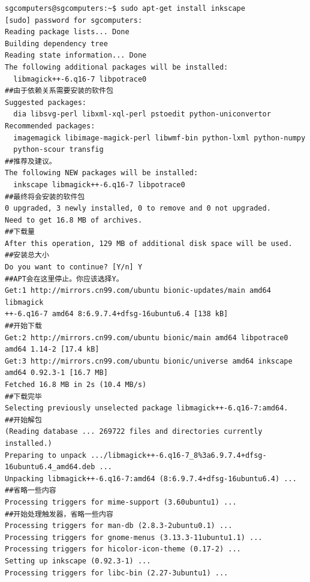 \begin{verbatim}
sgcomputers@sgcomputers:~$ sudo apt-get install inkscape
[sudo] password for sgcomputers: 
Reading package lists... Done
Building dependency tree       
Reading state information... Done
The following additional packages will be installed:
  libmagick++-6.q16-7 libpotrace0
##由于依赖关系需要安装的软件包
Suggested packages:
  dia libsvg-perl libxml-xql-perl pstoedit python-uniconvertor
Recommended packages:
  imagemagick libimage-magick-perl libwmf-bin python-lxml python-numpy
  python-scour transfig
##推荐及建议。
The following NEW packages will be installed:
  inkscape libmagick++-6.q16-7 libpotrace0
##最终将会安装的软件包
0 upgraded, 3 newly installed, 0 to remove and 0 not upgraded.
Need to get 16.8 MB of archives.
##下载量
After this operation, 129 MB of additional disk space will be used.
##安装总大小
Do you want to continue? [Y/n] Y
##APT会在这里停止。你应该选择Y。
Get:1 http://mirrors.cn99.com/ubuntu bionic-updates/main amd64 libmagick
++-6.q16-7 amd64 8:6.9.7.4+dfsg-16ubuntu6.4 [138 kB]
##开始下载
Get:2 http://mirrors.cn99.com/ubuntu bionic/main amd64 libpotrace0 amd64 1.14-2 [17.4 kB]
Get:3 http://mirrors.cn99.com/ubuntu bionic/universe amd64 inkscape amd64 0.92.3-1 [16.7 MB]
Fetched 16.8 MB in 2s (10.4 MB/s)
##下载完毕 
Selecting previously unselected package libmagick++-6.q16-7:amd64.
##开始解包
(Reading database ... 269722 files and directories currently installed.)
Preparing to unpack .../libmagick++-6.q16-7_8%3a6.9.7.4+dfsg-16ubuntu6.4_amd64.deb ...
Unpacking libmagick++-6.q16-7:amd64 (8:6.9.7.4+dfsg-16ubuntu6.4) ...
##省略一些内容
Processing triggers for mime-support (3.60ubuntu1) ...
##开始处理触发器，省略一些内容
Processing triggers for man-db (2.8.3-2ubuntu0.1) ...
Processing triggers for gnome-menus (3.13.3-11ubuntu1.1) ...
Processing triggers for hicolor-icon-theme (0.17-2) ...
Setting up inkscape (0.92.3-1) ...
Processing triggers for libc-bin (2.27-3ubuntu1) ...
\end{verbatim}
